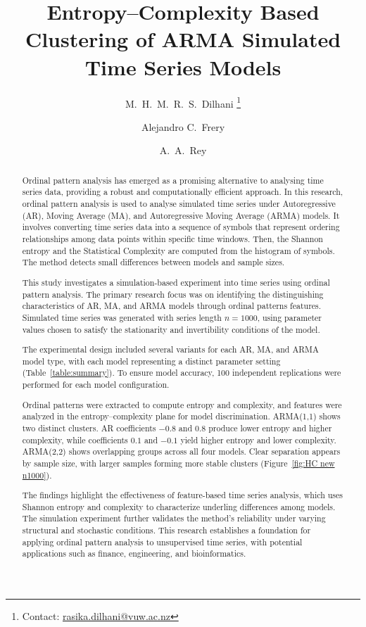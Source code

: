 \documentclass[11pt,a4paper]{article}
\title{\vspace{-1cm}Entropy–Complexity Based Clustering of ARMA Simulated Time Series Models\vspace{-0.3cm}}
\author[1]{M.\ H.\ M.\ R.\ S.\ Dilhani \thanks{Contact: \href{mailto:rasika.dilhani@vuw.ac.nz}{rasika.dilhani@vuw.ac.nz}}}
\author[1]{Alejandro C.\ Frery}
\author[2]{A.\ A.\ Rey}
\affil[1]{School of Mathematics and Statistics, Victoria University of Wellington, New Zealand}
\affil[2]{Laboratorio de Investigación y Desarrollo Experimental en Computación (LIDEC),\\
	Instituto de Tecnología e Ingeniería, Universidad Nacional de Hurlingham (UNAHUR), Argentina}
\date{}
\begin{document}
	\maketitle
	\vspace{-0.5cm}
	
	\begin{abstract}
		
				
		Ordinal pattern analysis has emerged as a promising alternative to analysing time series data, providing a robust and computationally efficient approach. In this research, ordinal pattern analysis is used to analyse simulated time series under Autoregressive (AR), Moving Average (MA), and Autoregressive Moving Average (ARMA) models. It involves converting time series data into a sequence of symbols that represent ordering relationships among data points within specific time windows. Then, the Shannon entropy and the Statistical Complexity are computed from the histogram of symbols. The method detects small differences between models and sample sizes.
		
		This study investigates a simulation-based experiment into time series using ordinal pattern analysis. The primary research focus was on identifying the distinguishing characteristics of AR, MA, and ARMA models through ordinal patterns features. Simulated time series was generated with series length $n = 1000$, using parameter values chosen to satisfy the stationarity and invertibility conditions of the model.
		
		The experimental design included several variants for each AR, MA, and ARMA model type, with each model representing a distinct parameter setting (Table~\ref{table:summary}). To ensure model accuracy, 100 independent replications were performed for each model configuration.
		
		Ordinal patterns were extracted to compute entropy and complexity, and features were analyzed in the entropy–complexity plane for model discrimination. ARMA(1,1) shows two distinct clusters. AR coefficients $-0.8$ and $0.8$ produce lower entropy and higher complexity, while coefficients $0.1$ and $-0.1$ yield higher entropy and lower complexity. ARMA(2,2) shows overlapping groups across all four models. Clear separation appears by sample size, with larger samples forming more stable clusters (Figure~\ref{fig:HC new n1000}).
		
		The findings highlight the effectiveness of feature-based time series analysis, which uses Shannon entropy and complexity to characterize underling differences among models. The simulation experiment further validates the method’s reliability under varying structural and stochastic conditions. This research establishes a foundation for applying ordinal pattern analysis to unsupervised time series, with potential applications such as finance, engineering, and bioinformatics.
		
	\end{abstract}
	
\end{document}

